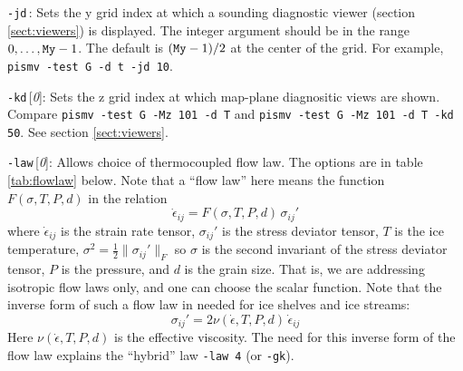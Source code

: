 \documentclass[11pt,final]{amsart}
\renewcommand{\t}[1]{\texttt{#1}}
\newcommand{\eps}{\epsilon}
\newcommand{\rawopt}[1]{\vspace{1mm}\noindent \large\texttt{-#1}\normalsize}
\newcommand{\opt}[1]{\rawopt{#1}\,:\quad}
\newcommand{\optdef}[2]{\rawopt{#1}\,[\textsl{#2}]:\quad}
\begin{document}
\opt{jd}  Sets the y grid index at which a sounding diagnostic viewer (section \ref{sect:viewers}) is displayed.  The integer argument should be in the range $0,\dots,\text{\t{My}}-1$.  The default is $(\text{\t{My}}-1)/2$ at the center of the grid.  For example, \verb|pismv -test G -d t -jd 10|.

\optdef{kd}{0}  Sets the z grid index at which map-plane diagnositic views are shown.  Compare \verb|pismv -test G -Mz 101 -d T| and \verb|pismv -test G -Mz 101 -d T -kd 50|.  See section \ref{sect:viewers}.

\optdef{law}{0}  Allows choice of thermocoupled flow law.  The options are in table \ref{tab:flowlaw} below.  Note that a ``flow law'' here means the function $F(\sigma,T,P,d)$ in the relation
	$$\dot \eps_{ij} = F(\sigma,T,P,d)\, \sigma_{ij}'$$
where $\dot \eps_{ij}$ is the strain rate tensor, $\sigma_{ij}'$ is the stress deviator tensor, $T$ is the ice temperature, $\sigma^2 = \frac{1}{2} \|\sigma_{ij}'\|_F$ so $\sigma$ is the second invariant of the stress deviator tensor, $P$ is the pressure, and $d$ is the grain size.  That is, we are addressing isotropic flow laws only, and one can choose the scalar function.  Note that the inverse form of such a flow law in needed for ice shelves and ice streams:
	$$\sigma_{ij}' = 2 \nu(\dot\eps,T,P,d)\,\dot \eps_{ij} $$
Here $\nu(\dot \eps,T,P,d)$ is the effective viscosity.  The need for this inverse form of the flow law explains the ``hybrid'' law \verb|-law 4| (or \verb|-gk|).
\end{document}
